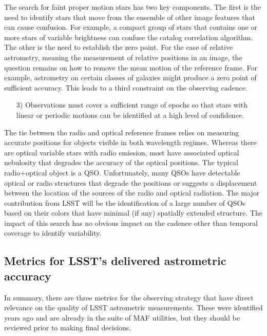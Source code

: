 The search for faint proper motion stars has two key components.  The first
is the need to identify stars that move from the ensemble of other image
features that can cause confusion.  For example, a compact group of stars
that contains one or more stars of variable brightness can confuse the catalog
correlation algorithm.  The other is the need to establish the zero point.
For the case of relative astrometry, meaning the measurement of relative
positions in an image, the question remains on how to remove the mean motion
of the reference frame.  For example, astrometry on certain classes of galaxies
might produce a zero point of sufficient accuracy.  This leads to a third
constraint on the observing cadence.
\begin{itemize}
\item [3)] Observations must cover a sufficient range of epochs so that stars with
linear or periodic motions can be identified at a high level of confidence.
\end{itemize}

The tie between the radio and optical reference frames relies on measuring
accurate positions for objects visible in both wavelength regimes.  Whereas
there are optical variable stars with radio emission, most have associated
optical nebulosity that degrades the accuracy of the optical positions.
The typical radio+optical object is a QSO.  Unfortunately, many QSOs have
detectable optical or radio structures that degrade the positions or
suggests a displacement between the location of the sources of the radio
and optical radiation.  The major contribution from LSST will be the
identification of a large number of QSOs based on their colors that have
minimal (if any) spatially extended structure.  The impact of this search
has no obvious impact on the cadence other than temporal coverage to
identify variability.

\subsection{Metrics for LSST's delivered astrometric accuracy}
\label{sec:keyword:MW_Astrometry_metrics}

In summary, there are three metrics for the observing strategy that have direct
relevance
on the quality of LSST astrometric measurements.  These were identified years
ago and are already in the suite of MAF utilities, but they should be
reviewed prior to making final decisions.

